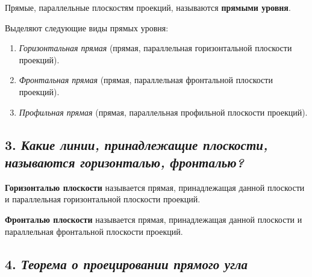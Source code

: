 Прямые, параллельные плоскостям проекций, называются {\bf прямыми
уровня}.

Выделяют следующие виды прямых уровня:
\begin{enumerate}
    \item \textit {Горизонтальная прямая} (прямая, параллельная горизонтальной плоскости проекций).
    

    \item \textit {Фронтальная прямая} (прямая, параллельная фронтальной плоскости проекций).


    \item \textit {Профильная прямая} (прямая, параллельная профильной плоскости проекций).


\end{enumerate}


\newpage
\subsection*{3. \textit{Какие линии, принадлежащие плоскости, называются горизонталью, фронталью?}}

\begin{mainQuote}
    
\end{mainQuote}

{\bf Горизонталью плоскости} называется прямая, принадлежащая данной плоскости и параллельная горизонтальной плоскости проекций.


{\bf Фронталью плоскости} называется прямая, принадлежащая данной плоскости и параллельная фронтальной плоскости проекций.



\newpage
\subsection*{4. \textit{Теорема о проецировании прямого угла}}

